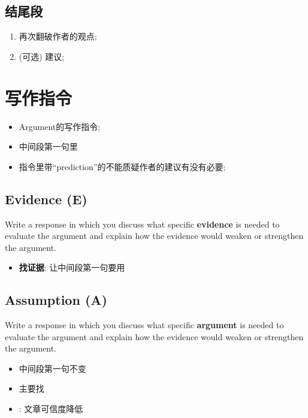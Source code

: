   \subsection{结尾段}

    \begin{enumerate}
      \item 再次翻破作者的观点;
      \item (可选) 建议;
    \end{enumerate}

\section{写作指令}

  \begin{itemize}
    \item Argument的写作指令;
    \item 中间段第一句里
    \item 指令里带“prediction”的不能质疑作者的建议有没有必要;
  \end{itemize}

  \subsection{Evidence (E)}

    Write a response in which you discuss what specific \textbf{evidence} is
    needed to evaluate the argument and explain how the evidence would weaken or
    strengthen the argument.

    \begin{itemize}
      \item \textbf{找证据}: 让中间段第一句要用
    \end{itemize}

  \subsection{Assumption (A)}

    Write a response in which you discuss what specific \textbf{argument} is
    needed to evaluate the argument and explain how the evidence would weaken or
    strengthen the argument.

    \begin{itemize}
      \item 中间段第一句不变
      \item 主要找 
      \item {}: 文章可信度降低
    \end{itemize}

